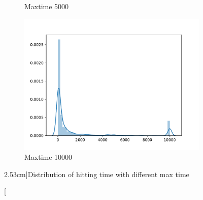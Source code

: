 \documentclass{homework}
\begin{document}
\begin{subproblem}[\roman*)]
\begin{figure}[h]
\begin{subfigure}[b]{0.3\textwidth}
                \caption{Maxtime 5000}
            \end{subfigure}
            \begin{subfigure}[b]{0.3\textwidth}
                \includegraphics[width=\textwidth]{max=10000}
                \caption{Maxtime 10000}
            \end{subfigure}
            \caption[][2.53cm]{Distribution of hitting time with different max time}
            \label{fig:dist}
        \end{figure}
    \end{subproblem}
\end{document}
